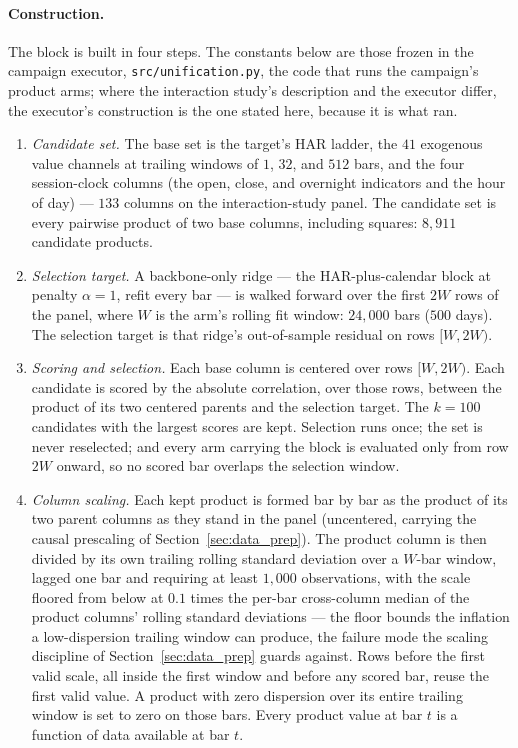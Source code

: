 \paragraph{Construction.} The block is built in four steps. The constants
below are those frozen in the campaign executor,
\texttt{src/unification.py}, the code that runs the campaign's product
arms; where the interaction study's description and the executor differ,
the executor's construction is the one stated here, because it is what
ran.
\begin{enumerate}
    \item \emph{Candidate set.} The base set is the target's HAR ladder,
    the $41$ exogenous value channels at trailing windows of $1$, $32$,
    and $512$ bars, and the four session-clock columns (the open, close,
    and overnight indicators and the hour of day) --- $133$ columns on
    the interaction-study panel. The candidate set is every pairwise
    product of two base columns, including squares: $8{,}911$ candidate
    products.
    \item \emph{Selection target.} A backbone-only ridge --- the
    HAR-plus-calendar block at penalty $\alpha = 1$, refit every bar ---
    is walked forward over the first $2W$ rows of the panel, where $W$ is
    the arm's rolling fit window: $24{,}000$ bars ($500$ days). The selection target is
    that ridge's out-of-sample residual on rows $[W, 2W)$.
    \item \emph{Scoring and selection.} Each base column is centered over
    rows $[W, 2W)$. Each candidate is scored by the absolute correlation,
    over those rows, between the product of its two centered parents and
    the selection target. The $k = 100$ candidates with the largest
    scores are kept. Selection runs once; the set is never reselected;
    and every arm carrying the block is evaluated only from row $2W$
    onward, so no scored bar overlaps the selection window.
    \item \emph{Column scaling.} Each kept product is formed bar by bar
    as the product of its two parent columns as they stand in the panel
    (uncentered, carrying the causal prescaling of
    Section~\ref{sec:data_prep}). The product column is then divided by
    its own trailing rolling standard deviation over a $W$-bar window,
    lagged one bar and requiring at least $1{,}000$ observations, with
    the scale floored from below at $0.1$ times the per-bar cross-column
    median of the product columns' rolling standard deviations --- the
    floor bounds the inflation a low-dispersion trailing window can
    produce, the failure mode the scaling discipline of
    Section~\ref{sec:data_prep} guards against. Rows before the first
    valid scale, all inside the first window and before any scored bar,
    reuse the first valid value. A product with zero dispersion over its
    entire trailing window is set to zero on those bars. Every product
    value at bar $t$ is a function of data available at bar $t$.
\end{enumerate}

